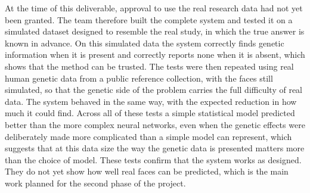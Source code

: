 At the time of this deliverable, approval to use the real research data had not yet been granted. The team therefore built the complete system and tested it on a simulated dataset designed to resemble the real study, in which the true answer is known in advance. On this simulated data the system correctly finds genetic information when it is present and correctly reports none when it is absent, which shows that the method can be trusted. The tests were then repeated using real human genetic data from a public reference collection, with the faces still simulated, so that the genetic side of the problem carries the full difficulty of real data. The system behaved in the same way, with the expected reduction in how much it could find. Across all of these tests a simple statistical model predicted better than the more complex neural networks, even when the genetic effects were deliberately made more complicated than a simple model can represent, which suggests that at this data size the way the genetic data is presented matters more than the choice of model. These tests confirm that the system works as designed. They do not yet show how well real faces can be predicted, which is the main work planned for the second phase of the project.
